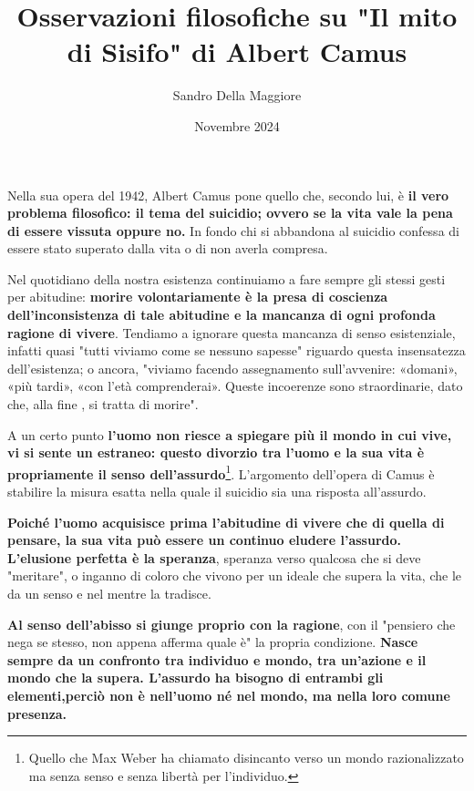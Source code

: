 \documentclass[a4paper,12pt,oneside]{article}%
\begin{document}
	\author{Sandro Della Maggiore}
	\title{Osservazioni filosofiche su "Il mito di Sisifo" di Albert Camus}
	\date{Novembre 2024}
	
	\maketitle
	
Nella sua opera del 1942, Albert Camus pone quello che, secondo lui, è \textbf{il vero problema filosofico: il tema del suicidio; ovvero se la vita vale la pena di essere vissuta	oppure no.} In fondo chi si abbandona al suicidio confessa di essere stato superato dalla vita o di non averla compresa.

Nel quotidiano della nostra esistenza continuiamo a fare sempre gli stessi gesti per abitudine: \textbf{morire volontariamente è la presa di coscienza dell'inconsistenza di tale abitudine e la mancanza di ogni profonda ragione di vivere}. Tendiamo a ignorare questa mancanza di senso esistenziale, infatti quasi "tutti viviamo come se nessuno sapesse" riguardo questa insensatezza dell'esistenza; o ancora, "viviamo facendo assegnamento sull'avvenire: «domani», «più tardi», «con l'età comprenderai». Queste incoerenze sono straordinarie, dato che, alla fine , si tratta di morire".

A un certo punto \textbf{l'uomo non riesce a spiegare più il mondo in cui vive, vi si sente un estraneo: questo divorzio tra l'uomo e la sua vita è propriamente il senso dell'assurdo}\footnote{Quello che Max Weber ha chiamato disincanto verso un mondo razionalizzato ma senza  senso e senza libertà per l'individuo.}. L'argomento dell'opera di Camus è stabilire la misura esatta nella quale il suicidio sia una risposta all'assurdo.

\textbf{Poiché l'uomo acquisisce prima l'abitudine di vivere che di quella di pensare, la sua vita può essere un continuo eludere l'assurdo. L'elusione perfetta è la speranza}, speranza verso qualcosa che si deve "meritare", o inganno di coloro che vivono per un ideale che supera la vita, che le da un senso e nel mentre la tradisce.

\textbf{Al senso dell'abisso si giunge proprio con la ragione}, con il "pensiero che nega se stesso, non appena afferma quale è" la propria condizione. \textbf{Nasce sempre da un confronto tra individuo e mondo, tra un'azione e il mondo che la supera. L'assurdo ha bisogno di entrambi gli elementi,perciò non è nell'uomo né nel mondo, ma nella loro comune presenza.}
\end{document}
